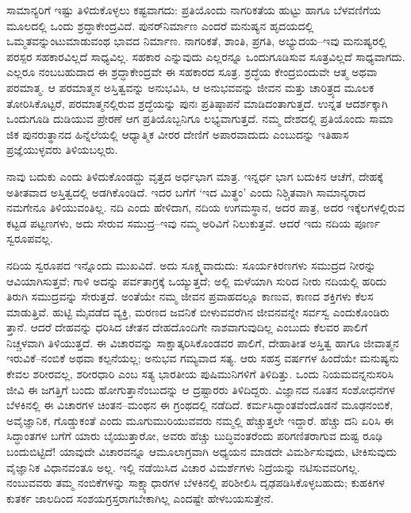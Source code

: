 \vskip 4pt

ಸಾಮಾನ್ಯರಿಗೆ ಇಷ್ಟು ತಿಳಿದುಕೊಳ್ಳಲು ಕಷ್ಟವಾಗದು: ಪ್ರತಿಯೊಂದು ನಾಗರಿಕತೆಯ ಹುಟ್ಟು ಹಾಗೂ ಬೆಳವಣಿಗೆಯ ಮೂಲದಲ್ಲಿ ಒಂದು ಶ್ರದ್ಧಾಕೇಂದ್ರವಿದೆ. ಪುನರ್​ನಿರ್ಮಾಣ ಎಂದರೆ ಮನುಷ್ಯನ ಹೃದಯದಲ್ಲಿ ಒಮ್ಮತವನ್ನುಂಟುಮಾಡುವಂಥ ಭಾವದ ನಿರ್ಮಾಣ. ನಾಗರಿಕತೆ, ಶಾಂತಿ, ಪ್ರಗತಿ, ಅಭ್ಯುದಯ–ಇವು ಮನುಷ್ಯರಲ್ಲಿ ಪರಸ್ಪರ ಸಹಕಾರವಿಲ್ಲದೆ ಸಾಧ್ಯವಿಲ್ಲ. ಸಹಕಾರ ಎನ್ನುವುದು ಎಲ್ಲರನ್ನೂ ಒಂದುಗೂಡಿಸುವ ಸೂತ್ರವಿಲ್ಲದೆ ಸಾಧ್ಯವಾಗದು. ಎಲ್ಲರೂ ನಂಬ\-ಬಹು\-ದಾದ ಈ ಶ್ರದ್ಧಾಕೇಂದ್ರವೇ ಈ ಸಹಕಾರದ ಸೂತ್ರ. ಶ್ರದ್ಧೆಯ ಕೇಂದ್ರಬಿಂದುವೇ ಆತ್ಮ ಅಥವಾ ಪರಮಾತ್ಮ. ಆ ಪರಮಾತ್ಮನ ಅಸ್ತಿತ್ವವನ್ನು ಅನುಭವಿಸಿ, ಆ ಅನುಭವವನ್ನು ಜೀವನ ಮತ್ತು ಚಾರಿತ್ರ್ಯದ ಮೂಲಕ ತೋರಿಸಿಕೊಟ್ಟರೆ, ಪರಮಾತ್ಮನಲ್ಲಿರುವ ಶ್ರದ್ಧೆಯನ್ನು ಪುನಃ ಪ್ರತಿಷ್ಠಾಪನೆ ಮಾಡಿದಂತಾಗುತ್ತದೆ. ಉನ್ನತ ಆದರ್ಶಕ್ಕಾಗಿ ಒಂದುಗೂಡಿ ದುಡಿಯುವ ಪ್ರೇರಣೆ ಆಗ ಪ್ರತಿ\-ಯೊಬ್ಬ\-ನಿಗೂ ಲಭ್ಯವಾಗುತ್ತದೆ. ನಮ್ಮ ದೇಶದಲ್ಲಿ ಪ್ರತಿಯೊಂದು ಸಾಮಾ ಜಿಕ ಪುನರುತ್ಥಾನದ ಹಿನ್ನೆಲೆಯಲ್ಲಿ ಆಧ್ಯಾತ್ಮಿಕ ವೀರರ ದೇಣಿಗೆ ಅಪಾರವಾದುದು ಎಂಬುದನ್ನು ಇತಿಹಾಸ ಪ್ರಜ್ಞೆಯುಳ್ಳವರು ತಿಳಿಯಬಲ್ಲರು.

\vskip 4pt

ನಾವು ಬದುಕು ಎಂದು ತಿಳಿದುಕೊಂಡದ್ದು ವೃತ್ತದ ಅರ್ಧಭಾಗ ಮಾತ್ರ. ಇನ್ನರ್ಧ ಭಾಗ ಬದುಕಿನ ಆಚೆಗೆ, ದೇಹಕ್ಕೆ ಅತೀತವಾದ ಅಸ್ತಿತ್ವದಲ್ಲಿ ಅಡಗಿಕೊಂಡಿದೆ. ಇದರ ಬಗೆಗೆ ‘ಇದ ಮಿತ್ಥಂ’ ಎಂದು ನಿಶ್ಚಿತವಾಗಿ ಸಾಮಾನ್ಯರಾದ ನಮಗೇನೂ ತಿಳಿಯುವಂತಿಲ್ಲ. ನದಿ ಎಂದು ಹೇಳಿದಾಗ, ನದಿಯ ಉಗಮಸ್ಥಾನ, ಅದರ ಪಾತ್ರ, ಅದರ ಇಕ್ಕೆಲಗಳಲ್ಲಿರುವ ಕಟ್ಟಡ ಪಟ್ಟಣಗಳು, ಅದು ಸೇರುವ ಸಮುದ್ರ–ಇವು ನಮ್ಮ ಅರಿವಿಗೆ ನಿಲುಕುತ್ತವೆ. ಆದರೆ ಇದು ನದಿಯ ಪೂರ್ಣ ಸ್ವರೂಪವಲ್ಲ.

ನದಿಯ ಸ್ವರೂಪದ ಇನ್ನೊಂದು ಮುಖವಿದೆ. ಅದು ಸೂಕ್ಷ್ಮವಾದುದು: ಸೂರ್ಯಕಿರಣಗಳು ಸಮುದ್ರದ ನೀರನ್ನು ಆವಿಯಾಗಿಸುತ್ತವೆ; ಗಾಳಿ ಅದನ್ನು ಪರ್ವತಾಗ್ರಕ್ಕೆ ಒಯ್ಯುತ್ತದೆ; ಅಲ್ಲಿ ಮಳೆಯಾಗಿ ಸುರಿದ ನೀರು ನದಿಯಲ್ಲಿ ಹರಿದು ತಿರುಗಿ ಸಮುದ್ರವನ್ನು ಸೇರುತ್ತದೆ. ಅಂತೆಯೇ ನಮ್ಮ ಜೀವನ ಪ್ರವಾಹದಲ್ಲೂ ಕಾಣುವ, ಕಾಣದ ಶಕ್ತಿಗಳು ಕೆಲಸ ಮಾಡುತ್ತಿವೆ. ಹುಟ್ಟಿ ಮೈವಡೆದ ವ್ಯಕ್ತಿ, ಮರಣದ ಜವನಿಕೆ ಬೀಳುವವರೆಗಿನ ಜೀವನವನ್ನೇ ಸರ್ವಸ್ವ ಎಂದುಕೊಂಡಿರು ತ್ತಾನೆ. ಆದರೆ ದೇಹವನ್ನು ಧರಿಸಿದ ಚೇತನ ದೇಹದೊಂದಿಗೇ ನಾಶವಾಗುವುದಿಲ್ಲ ಎಂಬುದು ಕೆಲವರ ಪಾಲಿಗೆ ನಿಚ್ಚಳವಾಗಿ ತಿಳಿಯುತ್ತದೆ. ಈ ವಿಚಾರವನ್ನು ಸಾಕ್ಷಾತ್ಕರಿಸಿಕೊಂಡವರ ಪಾಲಿಗೆ, ದೇಹಾತೀತ ಅಸ್ತಿತ್ವ ಹಾಗೂ ಜೀವಾತ್ಮನ ಇರುವಿಕೆ–ನಂಬಿಕೆ ಅಥವಾ ಕಲ್ಪನೆಯಲ್ಲ; ಅನುಭವ ಗಮ್ಯವಾದ ಸತ್ಯ. ಆರು ಸಹಸ್ರ ವರ್ಷಗಳ ಹಿಂದೆಯೇ ಮನುಷ್ಯನು ಕೇವಲ ಶರೀರವಲ್ಲ, ಶರೀರಧಾರಿ ಎಂಬ ಸತ್ಯ ಭಾರತೀಯ ಪುಷಿಮುನಿಗಳಿಗೆ ತಿಳಿದಿತ್ತು. ಒಂದು ನಿಯಮವನ್ನನುಸರಿಸಿ ಜೀವಿ ಈ ಜಗತ್ತಿಗೆ ಬಂದು ಹೋಗುತ್ತಾನೆಂಬುದನ್ನು ಆ ದ್ರಷ್ಟಾರರು ತಿಳಿದಿದ್ದರು. ವಿಜ್ಞಾನದ ನೂತನ ಸಂಶೋಧನೆಗಳ ಬೆಳಕಿನಲ್ಲಿ ಈ ವಿಚಾರಗಳ ಚಿಂತನ–ಮಂಥನ ಈ ಗ್ರಂಥದಲ್ಲಿ ನಡೆದಿದೆ. ಕರ್ಮಸಿದ್ಧಾಂತವೆಂದೊಡನೆ ಮೂಢನಂಬಿಕೆ, ಅವೈಜ್ಞಾನಿಕ, ಗೊಡ್ಡುಕಂತೆ ಎಂದು ಮೂಗು\break ಮುರಿಯು\-ವವರು ನಮ್ಮಲ್ಲಿ ಹೆಚ್ಚುತ್ತಲೇ ಇದ್ದಾರೆ. ಹೆಚ್ಚು ದನಿ ಏರಿಸಿ ಈ ಸಿದ್ಧಾಂತಗಳ ಬಗೆಗೆ ಯಾರು ಬೈಯುತ್ತಾರೋ, ಅವರು ಹೆಚ್ಚು ಬುದ್ಧಿವಂತರೆಂದು ಪರಿಗಣಿತರಾಗುವ ದುಷ್ಟ ರೂಢಿ ಬಂದುಬಿಟ್ಟಿದೆ! ಯಾವುದೇ ವಿಚಾರವನ್ನೂ ಆಮೂಲಾಗ್ರವಾಗಿ ಅಧ್ಯಯನ ಮಾಡದೇ ವಿಮರ್ಶಿಸುವುದು, ಟೀಕಿಸುವುದು ವೈಜ್ಞಾನಿಕ ವಿಧಾನವಂತೂ ಅಲ್ಲ. ಇಲ್ಲಿ ನಡೆಯಿಸಿದ ವಿಚಾರ ವಿಮರ್ಶೆಗಳು ನಿದ್ರೆಯನ್ನು ನಟಿಸುವವರಿಗಲ್ಲ. ನಂಬುವವರು ತಮ್ಮ ನಂಬಿಕೆಗಳನ್ನು ಸಾಕ್ಷ್ಯಾಧಾರಗಳ ಬೆಳಕಿನಲ್ಲಿ ಪರಿಶೀಲಿಸಿ ದೃಢಪಡಿಸಿಕೊಳ್ಳಬಹುದು; ಕುಹಕಿಗಳ ಕುತರ್ಕ ಜಾಲದಿಂದ ಸಂಶಯ\-ಗ್ರಸ್ತರಾಗಬೇಕಾಗಿಲ್ಲ ಎಂದಷ್ಟೇ ಹೇಳಬಯಸುತ್ತೇನೆ.

